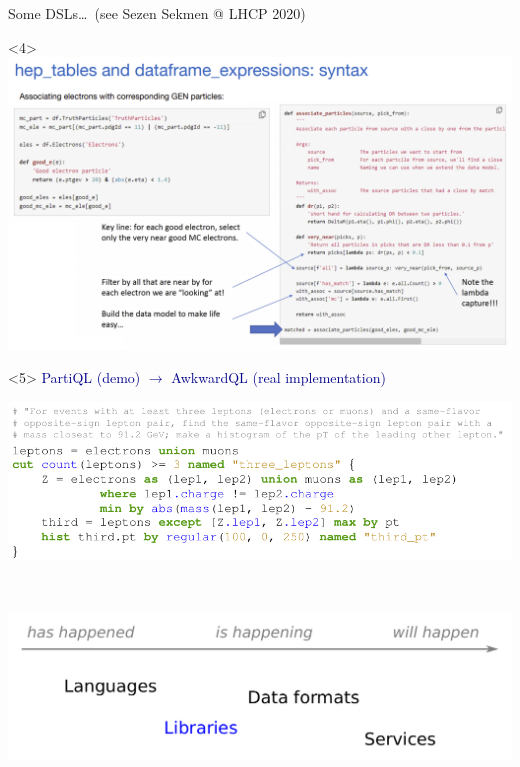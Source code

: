 \documentclass[aspectratio=169]{beamer}
\begin{document}
\begin{frame}{Some DSLs\ldots\ (see Sezen Sekmen @ LHCP 2020)}
\begin{center}
\begin{onlyenv}
\end{onlyenv}
\begin{onlyenv}<4>
\includegraphics[width=0.9\linewidth]{img/adl-4.png}
\end{onlyenv}
\begin{onlyenv}<5>
\textcolor{darkblue}{\large PartiQL (demo) $\to$ AwkwardQL (real implementation)\hspace{3 cm}}

\vspace{0.25 cm}
\includegraphics[width=0.9\linewidth]{img/adl-5.png}
\end{onlyenv}
\end{center}
\end{frame}

\begin{frame}{\mbox{ }}
\vspace{0.5 cm}

\begin{center}
\includegraphics[width=0.9\linewidth]{img/topics-2.pdf}
\end{center}
\end{frame}
\end{document}
